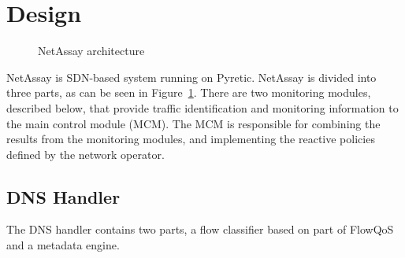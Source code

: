 \documentclass{sig-alternate}
\newcommand\tti[1]{\small\texttt{#1}\normalsize}
\newcommand\system{NetAssay}
\begin{document}
\section{Design}


\begin{figure}
    \centering
    \caption{\system{} architecture}
    \label{fig:architecture}
\end{figure}


\system{} is SDN-based system running on Pyretic.\cite{pyretic} %
\system{} is divided into three parts, as can be seen in Figure~\ref{fig:architecture}. There are two monitoring modules, described below, that provide traffic identification and monitoring information to the main control module (MCM). %
The MCM is responsible for combining the results from the monitoring modules, and implementing the reactive policies defined by the network operator.



\subsection{DNS Handler}
The DNS handler contains two parts, a flow classifier based on part of FlowQoS~\cite{FlowQoS} and a metadata engine. %
\end{document}
